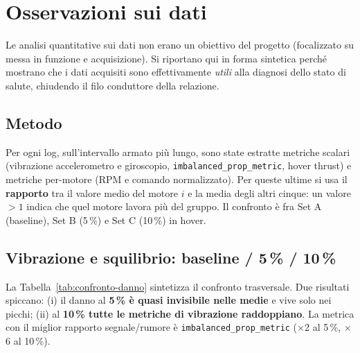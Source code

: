 \chapter{Osservazioni sui dati}
\label{cap:osservazioni}

\begin{notabox}
Le analisi quantitative sui dati non erano un obiettivo del progetto (focalizzato
su messa in funzione e acquisizione). Si riportano qui in forma sintetica perch\'e
mostrano che i dati acquisiti sono effettivamente \emph{utili} alla diagnosi
dello stato di salute, chiudendo il filo conduttore della relazione.
\end{notabox}

\section{Metodo}

Per ogni log, sull'intervallo armato pi\`u lungo, sono state estratte metriche
scalari (vibrazione accelerometro e giroscopio, \texttt{imbalanced\_prop\_metric},
hover thrust) e metriche per-motore (RPM e comando normalizzato). Per queste
ultime si usa il \textbf{rapporto} tra il valore medio del motore $i$ e la media
degli altri cinque: un valore $>1$ indica che quel motore lavora pi\`u del gruppo.
Il confronto \`e fra Set A (baseline), Set B (5\,\%) e Set C (10\,\%) in hover.

\section{Vibrazione e squilibrio: baseline / 5\,\% / 10\,\%}

La Tabella~\ref{tab:confronto-danno} sintetizza il confronto trasversale. Due
risultati spiccano: (i) il danno al \textbf{5\,\% \`e quasi invisibile nelle
medie} e vive solo nei picchi; (ii) al \textbf{10\,\% tutte le metriche di
vibrazione raddoppiano}. La metrica con il miglior rapporto segnale/rumore \`e
\texttt{imbalanced\_prop\_metric} ($\times$2 al 5\,\%, $\times$6 al 10\,\%).

